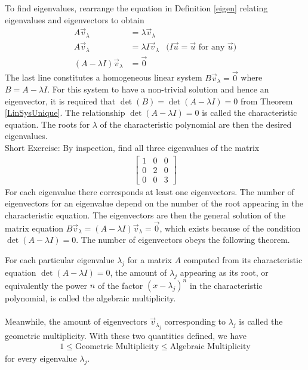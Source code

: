 To find eigenvalues, rearrange the equation in Definition \ref{eigen} relating eigenvalues and eigenvectors to obtain
\begin{align*}
A\vec{v}_\lambda &= \lambda\vec{v}_\lambda \\
A\vec{v}_\lambda &= \lambda I\vec{v}_\lambda  &\text{($I\vec{u} = \vec{u}$ for any $\vec{u}$)} \\
(A-\lambda I)\vec{v}_\lambda &= \vec{0}
\end{align*}
The last line constitutes a homogeneous linear system $B\vec{v}_\lambda = \vec{0}$ where $B = A - \lambda I$. For this system to have a non-trivial solution and hence an eigenvector, it is required that $\det(B) = \det(A - \lambda I) = 0$ from Theorem \ref{LinSysUnique}. The relationship $\det(A - \lambda I) = 0$ is called the characteristic equation. The roots for $\lambda$ of the characteristic polynomial are then the desired eigenvalues. \\
Short Exercise: By inspection, find all three eigenvalues of the matrix
\begin{align*}
\begin{bmatrix}
1 & 0 & 0 \\
0 & 2 & 0 \\
0 & 0 & 3
\end{bmatrix}
\end{align*}
For each eigenvalue there corresponds at least one eigenvectors. The number of eigenvectors for an eigenvalue depend on the number of the root appearing in the characteristic equation. The eigenvectors are then the general solution of the matrix equation $B\vec{v}_\lambda = (A - \lambda I)\vec{v}_\lambda = \vec{0}$, which exists because of the condition $\det(A - \lambda I) = 0$. The number of eigenvectors obeys the following theorem.
\begin{thm}
For each particular eigenvalue $\lambda_j$ for a matrix $A$ computed from its characteristic equation $\det(A - \lambda I) = 0$, the amount of $\lambda_j$ appearing as its root, or equivalently the power $n$ of the factor $(x-\lambda_j)^n$ in the characteristic polynomial, is called the algebraic multiplicity. \\
\\
Meanwhile, the amount of eigenvectors $\vec{v}_{\lambda_j}$ corresponding to $\lambda_j$ is called the geometric multiplicity. With these two quantities defined, we have
\begin{align*}
1 \leq \text{Geometric Multiplicity} \leq \text{Algebraic Multiplicity}
\end{align*}
for every eigenvalue $\lambda_j$.
\end{thm}


